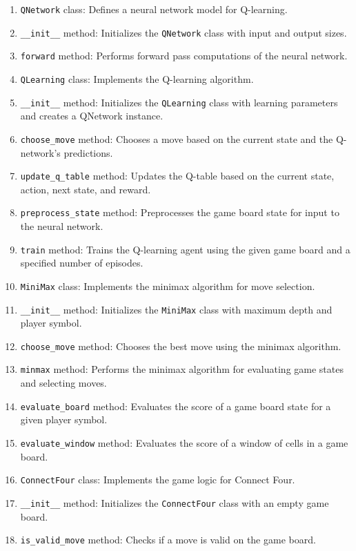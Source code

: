 \documentclass{article}
\begin{document}
\begin{enumerate}
  \item \texttt{QNetwork} class: Defines a neural network model for Q-learning.
  \item \texttt{\_\_init\_\_} method: Initializes the \texttt{QNetwork} class with input and output sizes.
  \item \texttt{forward} method: Performs forward pass computations of the neural network.
  \item \texttt{QLearning} class: Implements the Q-learning algorithm.
  \item \texttt{\_\_init\_\_} method: Initializes the \texttt{QLearning} class with learning parameters and creates a QNetwork instance.
  \item \texttt{choose\_move} method: Chooses a move based on the current state and the Q-network's predictions.
  \item \texttt{update\_q\_table} method: Updates the Q-table based on the current state, action, next state, and reward.
  \item \texttt{preprocess\_state} method: Preprocesses the game board state for input to the neural network.
  \item \texttt{train} method: Trains the Q-learning agent using the given game board and a specified number of episodes.
  \item \texttt{MiniMax} class: Implements the minimax algorithm for move selection.
  \item \texttt{\_\_init\_\_} method: Initializes the \texttt{MiniMax} class with maximum depth and player symbol.
  \item \texttt{choose\_move} method: Chooses the best move using the minimax algorithm.
  \item \texttt{minmax} method: Performs the minimax algorithm for evaluating game states and selecting moves.
  \item \texttt{evaluate\_board} method: Evaluates the score of a game board state for a given player symbol.
  \item \texttt{evaluate\_window} method: Evaluates the score of a window of cells in a game board.
  \item \texttt{ConnectFour} class: Implements the game logic for Connect Four.
  \item \texttt{\_\_init\_\_} method: Initializes the \texttt{ConnectFour} class with an empty game board.
  \item \texttt{is\_valid\_move} method: Checks if a move is valid on the game board.

\end{enumerate}
\end{document}
